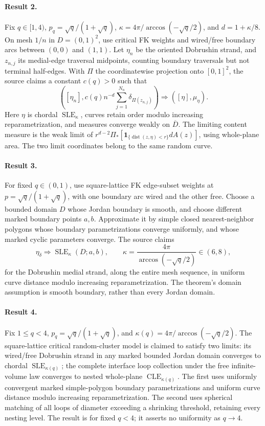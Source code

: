 \documentclass[11pt]{article}
\begin{document}
\paragraph{Result 2.} Fix \(q\in[1,4)\), \(p_q=\sqrt q/(1+\sqrt q)\), \(\kappa=4\pi/\arccos(-\sqrt q/2)\), and \(d=1+\kappa/8\). On mesh \(1/n\) in \(D=(0,1)^2\), use critical FK weights and wired/free boundary arcs between \((0,0)\) and \((1,1)\). Let \(\eta_n\) be the oriented Dobrushin strand, and \(z_{n,j}\) its medial-edge traversal midpoints, counting boundary traversals but not terminal half-edges. With \(\Pi\) the coordinatewise projection onto \([0,1]^2\), the source claims a constant \(c(q)>0\) such that
\[
 ([\eta_n],c(q)n^{-d}\sum_{j=1}^{N_n}\delta_{\Pi(z_{n,j})})
 \Longrightarrow([\eta],\mu_\eta).
\]
Here \(\eta\) is chordal \(\operatorname{SLE}_\kappa\), curves retain order modulo increasing reparametrization, and measures converge weakly on \(\overline D\). The limiting content measure is the weak limit of \(r^{d-2}\Pi_*[\mathbf1_{\{\operatorname{dist}(z,\eta)<r\}}dA(z)]\), using whole-plane area. The two limit coordinates belong to the same random curve.

\paragraph{Result 3.} For fixed \(q\in(0,1)\), use square-lattice FK edge-subset weights at \(p=\sqrt q/(1+\sqrt q)\), with one boundary arc wired and the other free. Choose a bounded domain \(D\) whose Jordan boundary is smooth, and choose different marked boundary points \(a,b\). Approximate it by simple closed nearest-neighbor polygons whose boundary parametrizations converge uniformly, and whose marked cyclic parameters converge. The source claims
\[
 \eta_\delta\Longrightarrow\operatorname{SLE}_\kappa(D;a,b),\qquad
 \kappa=\frac{4\pi}{\arccos(-\sqrt q/2)}\in(6,8),
\]
for the Dobrushin medial strand, along the entire mesh sequence, in uniform curve distance modulo increasing reparametrization. The theorem's domain assumption is smooth boundary, rather than every Jordan domain.

\paragraph{Result 4.} Fix \(1\le q<4\), \(p_q=\sqrt q/(1+\sqrt q)\), and \(\kappa(q)=4\pi/\arccos(-\sqrt q/2)\). The square-lattice critical random-cluster model is claimed to satisfy two limits: its wired/free Dobrushin strand in any marked bounded Jordan domain converges to chordal \(\operatorname{SLE}_{\kappa(q)}\); the complete interface loop collection under the free infinite-volume law converges to nested whole-plane \(\operatorname{CLE}_{\kappa(q)}\). The first uses uniformly convergent marked simple-polygon boundary parametrizations and uniform curve distance modulo increasing reparametrization. The second uses spherical matching of all loops of diameter exceeding a shrinking threshold, retaining every nesting level. The result is for fixed \(q<4\); it asserts no uniformity as \(q\to4\).
\end{document}

